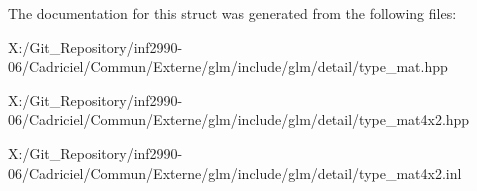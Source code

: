 The documentation for this struct was generated from the following files\-:\begin{DoxyCompactItemize}
\item 
X\-:/\-Git\-\_\-\-Repository/inf2990-\/06/\-Cadriciel/\-Commun/\-Externe/glm/include/glm/detail/type\-\_\-mat.\-hpp\item 
X\-:/\-Git\-\_\-\-Repository/inf2990-\/06/\-Cadriciel/\-Commun/\-Externe/glm/include/glm/detail/type\-\_\-mat4x2.\-hpp\item 
X\-:/\-Git\-\_\-\-Repository/inf2990-\/06/\-Cadriciel/\-Commun/\-Externe/glm/include/glm/detail/type\-\_\-mat4x2.\-inl\end{DoxyCompactItemize}

